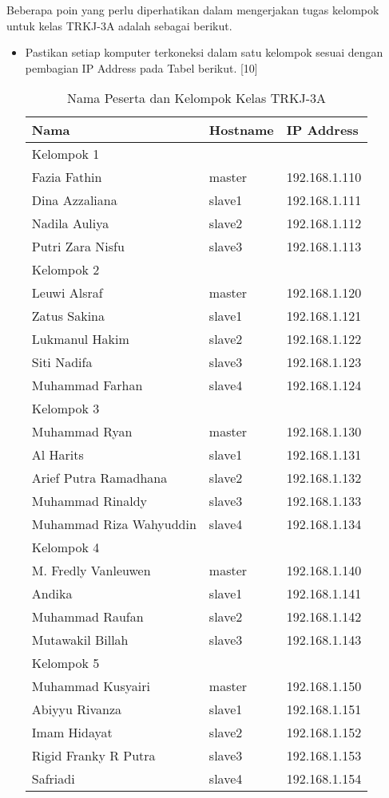 \documentclass[a4paper]{tufte-handout}
\begin{document}
Beberapa poin yang perlu diperhatikan dalam mengerjakan tugas kelompok untuk kelas TRKJ-3A adalah sebagai berikut.
\begin{itemize}
\item Pastikan setiap komputer terkoneksi dalam satu kelompok sesuai dengan pembagian IP Address pada Tabel berikut. [10]
\begin{table}[!ht]
\caption{Nama Peserta dan Kelompok Kelas TRKJ-3A}
\label{tab:peserta}
\centering
\begin{tabular}{lll} 
\toprule
Nama &	Hostname	& IP Address \\
\midrule
Kelompok 1\\
\midrule
Fazia Fathin			& master	& 192.168.1.110 \\
Dina Azzaliana			& slave1	& 192.168.1.111 \\
Nadila Auliya	    	& slave2	& 192.168.1.112 \\
Putri Zara Nisfu		& slave3	& 192.168.1.113 \\
\midrule
Kelompok 2\\
\midrule
Leuwi Alsraf			& master	& 192.168.1.120 \\
Zatus Sakina			& slave1	& 192.168.1.121 \\
Lukmanul Hakim			& slave2	& 192.168.1.122 \\
Siti Nadifa				& slave3	& 192.168.1.123 \\
Muhammad Farhan			& slave4	& 192.168.1.124 \\
\midrule
Kelompok 3\\
\midrule
Muhammad Ryan			& master	& 192.168.1.130 \\
Al Harits				& slave1	& 192.168.1.131 \\
Arief Putra Ramadhana	& slave2	& 192.168.1.132 \\
Muhammad Rinaldy		& slave3	& 192.168.1.133 \\
Muhammad Riza Wahyuddin	& slave4	& 192.168.1.134 \\
\midrule
Kelompok 4\\
\midrule
M. Fredly Vanleuwen		& master	& 192.168.1.140 \\
Andika					& slave1	& 192.168.1.141 \\
Muhammad Raufan			& slave2	& 192.168.1.142 \\
Mutawakil Billah		& slave3	& 192.168.1.143 \\
\midrule
Kelompok 5\\
\midrule
Muhammad Kusyairi		& master	& 192.168.1.150 \\
Abiyyu Rivanza			& slave1	& 192.168.1.151 \\
Imam Hidayat			& slave2	& 192.168.1.152 \\
Rigid Franky R Putra	& slave3	& 192.168.1.153 \\
Safriadi         		& slave4	& 192.168.1.154 \\
\midrule
\end{tabular}
\end{table}


\end{itemize}
\end{document}
